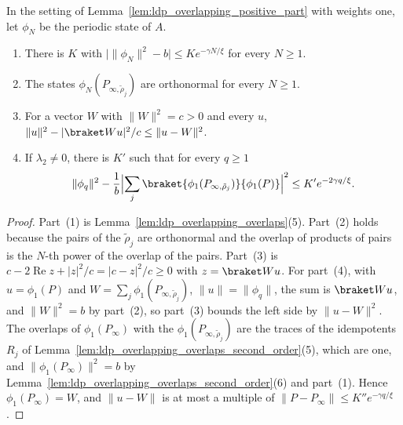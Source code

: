 \begin{lemma}
    \label{lem:ldp_overlapping_one_block_second_order}
    \leanok
    In the setting of Lemma~\ref{lem:ldp_overlapping_positive_part} with weights one, let
    $\phi_N$ be the periodic state of $A$.
    \begin{enumerate}
        \item There is $K$ with $\bigl\lvert\lVert\phi_N\rVert^2-b\bigr\rvert\le Ke^{-\gamma N/\xi}$
              for every $N\ge1$.
        \item The states $\phi_N(P_{\infty,\tilde\rho_j})$ are orthonormal for every $N\ge1$.
        \item For a vector $W$ with $\lVert W\rVert^2=c>0$ and every $u$,
              $\lVert u\rVert^2-\lvert\braket Wu\rvert^2/c\le\lVert u-W\rVert^2$.
        \item If $\lambda_2\neq0$, there is $K'$ such that for every $q\ge1$
              \begin{align*}
                  \lVert\phi_q\rVert^2-\frac1b\Bigl\lvert\sum_j
                  \braket{\phi_1(P_{\infty,\tilde\rho_j})}{\phi_1(P)}\Bigr\rvert^2
                  \le K'e^{-2\gamma q/\xi}.
              \end{align*}
    \end{enumerate}
\end{lemma}
\begin{proof}
    \leanok
    Part~(1) is Lemma~\ref{lem:ldp_overlapping_overlaps}(5). Part~(2)
    holds because the pairs of the $\tilde\rho_j$ are orthonormal and the overlap of products
    of pairs is the $N$-th power of the overlap of the pairs. Part~(3) is
    $c-2\operatorname{Re}z+\lvert z\rvert^2/c=\lvert c-z\rvert^2/c\ge0$ with $z=\braket Wu$.
    For part~(4), with $u=\phi_1(P)$ and $W=\sum_j\phi_1(P_{\infty,\tilde\rho_j})$,
    $\lVert u\rVert=\lVert\phi_q\rVert$, the sum is $\braket Wu$, and
    $\lVert W\rVert^2=b$ by part~(2), so part~(3) bounds the left side by
    $\lVert u-W\rVert^2$. The overlaps of $\phi_1(P_\infty)$ with the
    $\phi_1(P_{\infty,\tilde\rho_j})$ are the traces of the idempotents $R_j$ of
    Lemma~\ref{lem:ldp_overlapping_overlaps_second_order}(5), which are one, and
    $\lVert\phi_1(P_\infty)\rVert^2=b$ by
    Lemma~\ref{lem:ldp_overlapping_overlaps_second_order}(6) and part~(1). Hence
    $\phi_1(P_\infty)=W$, and $\lVert u-W\rVert$ is at most a multiple of
    $\lVert P-P_\infty\rVert\le K''e^{-\gamma q/\xi}$.
\end{proof}

